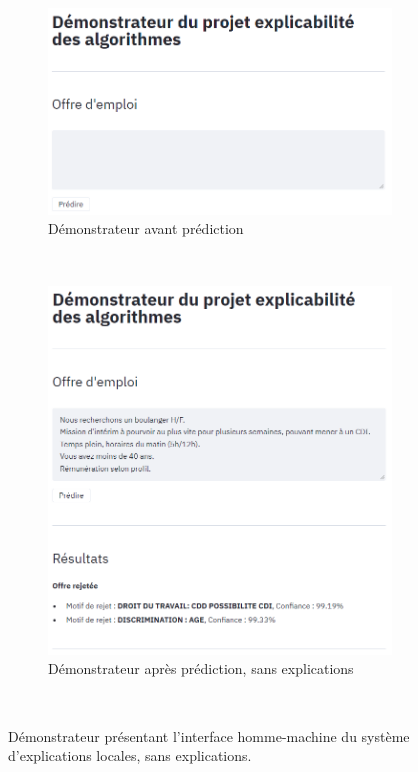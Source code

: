  \begin{figure}[htpb!]
     \centering
     \begin{subfigure}[b]{0.48\textwidth}
        \centering \includegraphics[width=\textwidth]{S2-Explicabilite_locale/figures/demo_empty.png}
        \caption{Démonstrateur avant prédiction}
        \label{fig:demo_empty}
     \end{subfigure}
     ~
     \begin{subfigure}[b]{0.48\textwidth}
        \centering \includegraphics[width=\textwidth]{S2-Explicabilite_locale/figures/demo_base.png}
        \caption{Démonstrateur après prédiction, sans explications}
        \label{fig:demo_base}
     \end{subfigure}
     ~
     \caption{Démonstrateur présentant l'interface homme-machine du système d’explications locales, sans explications.
     }\label{fig:demo_no_exp}
 \end{figure}

